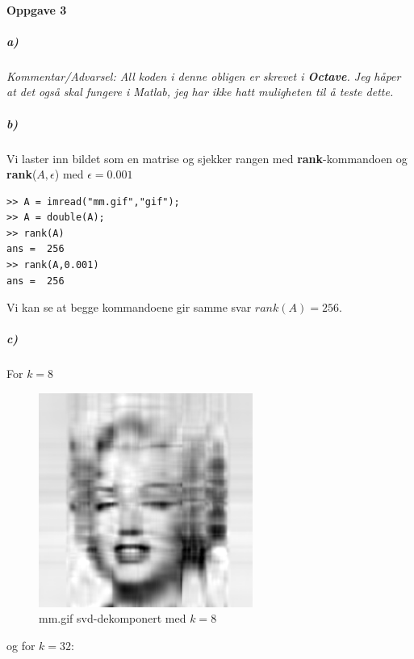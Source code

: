\documentclass[a4paper,norsk, 10pt]{article}
\begin{document}
\newpage

\paragraph*{Oppgave 3}

\subparagraph*{a)}

\hspace{5mm}

\textit{Kommentar/Advarsel: All koden i denne obligen er skrevet i \textbf{Octave}. Jeg håper at det også skal fungere i Matlab, jeg har ikke hatt muligheten til å teste dette.}\\



\subparagraph*{b)}

Vi laster inn bildet som en matrise og sjekker rangen med \textbf{rank}-kommandoen og \textbf{rank}($A,\epsilon$) med $\epsilon = 0.001$

\begin{verbatim}
>> A = imread("mm.gif","gif");
>> A = double(A);
>> rank(A)
ans =  256
>> rank(A,0.001)
ans =  256
\end{verbatim}

Vi kan se at begge kommandoene gir samme svar $rank(A) = 256$.

\newpage

\subparagraph*{c)}

For $k = 8$

\begin{figure}[H]
\begin{center}
\includegraphics[width = 70mm]{k8.png}
\caption{mm.gif svd-dekomponert med $k=8$}
\end{center}
\end{figure}

og for $k = 32$:
\end{document}
